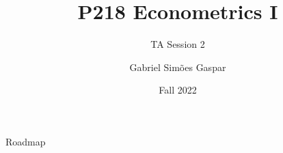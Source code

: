 \documentclass[10pt, xcolor=dvipsnames,compress]{beamer}
\title{P218 Econometrics I}
\subtitle{TA Session 2}
\author{Gabriel Simões Gaspar}
\institute{London Business School}
\date{Fall 2022}
\begin{document}
\maketitle

\begin{frame}{Roadmap}
    \tableofcontents
\end{frame}













\end{document}
